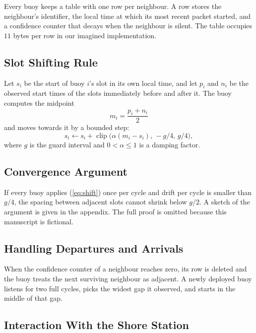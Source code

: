 \documentclass[conference]{IEEEtran}
\begin{document}
Every buoy keeps a table with one row per neighbour. A row stores the
neighbour's identifier, the local time at which its most recent packet started,
and a confidence counter that decays when the neighbour is silent. The table
occupies $11$ bytes per row in our imagined implementation.

\subsection{Slot Shifting Rule}
\label{sec:design-shift}

Let $s_i$ be the start of buoy $i$'s slot in its own local time, and let
$p_i$ and $n_i$ be the observed start times of the slots immediately before and
after it. The buoy computes the midpoint
\begin{equation}
  m_i = \frac{p_i + n_i}{2}
  \label{eq:midpoint}
\end{equation}
and moves towards it by a bounded step:
\begin{equation}
  s_i \leftarrow s_i + \operatorname{clip}\bigl(\alpha (m_i - s_i),\, -g/4,\, g/4\bigr),
  \label{eq:shift}
\end{equation}
where $g$ is the guard interval and $0 < \alpha \le 1$ is a damping factor.

\subsection{Convergence Argument}
\label{sec:design-converge}

If every buoy applies (\ref{eq:shift}) once per cycle and drift per cycle is
smaller than $g/4$, the spacing between adjacent slots cannot shrink below
$g/2$. A sketch of the argument is given in the appendix. The full proof is
omitted because this manuscript is fictional.

\subsection{Handling Departures and Arrivals}
\label{sec:design-churn}

When the confidence counter of a neighbour reaches zero, its row is deleted and
the buoy treats the next surviving neighbour as adjacent. A newly deployed buoy
listens for two full cycles, picks the widest gap it observed, and starts in
the middle of that gap.

\subsection{Interaction With the Shore Station}
\label{sec:design-shore}
\end{document}
